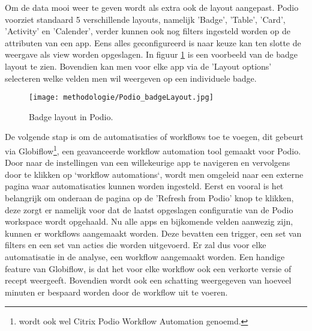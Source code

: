 Om de data mooi weer te geven wordt als extra ook de layout aangepast. Podio voorziet standaard 5 verschillende layouts, namelijk 'Badge', 'Table', 'Card', 'Activity' en 'Calender', verder kunnen ook nog filters ingesteld worden op de attributen van een app. Eens alles geconfigureerd is naar keuze kan ten slotte de weergave als view worden opgeslagen. In figuur \ref{fig:meth_podio_badgeLayout} is een voorbeeld van de badge layout te zien. Bovendien kan men voor elke app via de 'Layout options' selecteren welke velden men wil weergeven op een individuele badge. \\

\begin{figure}[h]
    \centering
    \texttt{[image: methodologie/Podio\_badgeLayout.jpg]}
    \caption{Badge layout in Podio.}
    \label{fig:meth_podio_badgeLayout}
\end{figure}

De volgende stap is om de automatisaties of workflows toe te voegen, dit gebeurt via Globiflow\footnote{wordt ook wel Citrix Podio Workflow Automation genoemd.}, een geavanceerde workflow automation tool gemaakt voor Podio. Door naar de instellingen van een willekeurige app te navigeren en vervolgens door te klikken op `workflow automations`, wordt men omgeleid naar een externe pagina waar automatisaties kunnen worden ingesteld. Eerst en vooral is het belangrijk om onderaan de pagina op de 'Refresh from Podio' knop te klikken, deze zorgt er namelijk voor dat de laatst opgeslagen configuratie van de Podio workspace wordt opgehaald. Nu alle apps en bijkomende velden aanwezig zijn, kunnen er workflows aangemaakt worden. Deze bevatten een trigger, een set van filters en een set van acties die worden uitgevoerd. Er zal dus voor elke automatisatie in de analyse, een workflow aangemaakt worden. Een handige feature van Globiflow, is dat het voor elke workflow ook een verkorte versie of recept weergeeft. Bovendien wordt ook een schatting weergegeven van hoeveel minuten er bespaard worden door de workflow uit te voeren. \\

